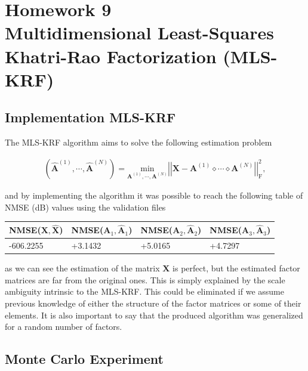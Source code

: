\documentclass[a4paper,10pt]{article}
\begin{document}
\newpage
\section*{Homework 9 \\ Multidimensional Least-Squares Khatri-Rao Factorization
(MLS-KRF)}

    \subsection*{Implementation MLS-KRF}
        
    The MLS-KRF algorithm aims to solve the following estimation problem 
    
    \begin{align}
        \left(\hat{\boldsymbol{A}}^{(1)}, \cdots, \hat{\boldsymbol{A}}^{(N)}\right) = \underset{\boldsymbol{A}^{(1)}, \cdots, \boldsymbol{A}^{(N)}}{\text{min}} \left|\left| \boldsymbol{X} - \boldsymbol{A}^{(1)} \diamond \cdots \diamond \boldsymbol{A}^{(N)} \right|\right|^2_{\text{F}},
    \end{align}

    and by implementing the algorithm it was possible to reach the following table of NMSE (dB) values using the validation files 

    \begin{table}[ht!]
        \centering
        \begin{tabular}{|l|l|l|l|}
        \hline
        NMSE($\boldsymbol{X}, \boldsymbol{\hat{X}}$) & NMSE($\boldsymbol{A}_{1}, \boldsymbol{\hat{A}}_{1}$) & NMSE($\boldsymbol{A}_{2}, \boldsymbol{\hat{A}}_{2}$) & NMSE($\boldsymbol{A}_{3}, \boldsymbol{\hat{A}}_{3}$) \\ \hline
        -606.2255 & +3.1432 & +5.0165 & +4.7297 \\ \hline
        \end{tabular}
    \end{table}

    as we can see the estimation of the matrix $\boldsymbol{X}$ is perfect, but the estimated factor matrices are far from the original ones. This is simply explained by 
    the scale ambiguity intrinsic to the MLS-KRF. This could be eliminated if we assume previous knowledge of either the structure of the factor matrices or some of their elements.
    It is also important to say that the produced algorithm was generalized for a random number of factors.

    \subsection*{Monte Carlo Experiment}
\end{document}

